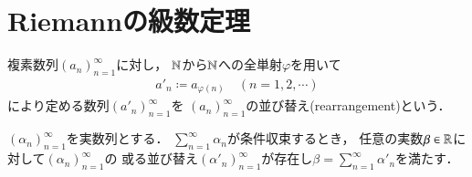 \chapter{Riemannの級数定理\label{chap:Riemann_series}}

	複素数列$(a_n)_{n=1}^{\infty}$に対し，
	$\mathbb{N}$から$\mathbb{N}$への全単射$\varphi$を用いて
	\begin{align}
		a'_n \coloneqq a_{\varphi(n)} \quad (n=1,2,\cdots)
	\end{align}
	により定める数列$\left( a'_n \right)_{n=1}^{\infty}$を
	$(a_n)_{n=1}^{\infty}$の並び替え(rearrangement)という．
	
	\begin{screen}
		\begin{thm}[Riemannの級数定理]
			$(\alpha_n)_{n=1}^{\infty}$を実数列とする．
			$\sum_{n=1}^{\infty} \alpha_n$が条件収束するとき，
			任意の実数$\beta \in \mathbb{R}$に対して$(\alpha_n)_{n=1}^{\infty}$の
			或る並び替え$(\alpha'_n)_{n=1}^{\infty}$が存在し$\beta = \sum_{n=1}^{\infty} \alpha'_n$を満たす．
			\label{thm:Riemann_series}
		\end{thm}
	\end{screen}
	
